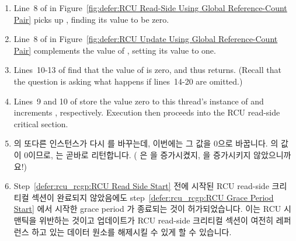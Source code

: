 {\begin{enumerate}
	\item	Line~8 of  in
		Figure~\ref{fig:defer:RCU Read-Side Using Global Reference-Count Pair}
		picks up , finding its value to be zero.
	\item	Line~8 of  in
		Figure~\ref{fig:defer:RCU Update Using Global Reference-Count Pair}
		complements the value of , setting its
		value to one.
	\item	Lines~10-13 of  find that the
		value of  is zero, and thus
		returns.
		(Recall that the question is asking what happens if
		lines~14-20 are omitted.)
	\item	Lines~9 and 10 of  store the
		value zero to this thread's instance of 
		and increments , respectively.
		Execution then proceeds into the RCU read-side critical
		section.
		\label{defer:rcu_rcgp:RCU Read Side Start}
	\fi
	\item	{} 의 또다른 인스턴스가 다시 
		를 바꾸는데, 이번에는 그 값을 0으로 바꿉니다.
		 의 값이 0이므로,  는
		곧바로 리턴합니다.
		( 은  을 증가시켰지,
		 을 증가시키지 않았으니까요!)
		\label{defer:rcu_rcgp:RCU Grace Period Start}
	\item	Step~\ref{defer:rcu_rcgp:RCU Read Side Start} 전에 시작된 RCU
		read-side 크리티컬 섹션이 완료되지 않았음에도
		step~\ref{defer:rcu_rcgp:RCU Grace Period Start} 에서 시작한
		grace period 가 종료되는 것이 허가되었습니다.
		이는 RCU 시맨틱을 위반하는 것이고 업데이트가 RCU read-side
		크리티컬 섹션이 여전히 레퍼런스 하고 있는 데이터 원소를
		해제시킬 수 있게 할 수 있습니다.
	\iffalse

	\item	Another instance of \co{synchronize_rcu()} again complements
		\co{rcu_idx}, this time setting its value to zero.
		Because \co{rcu_refcnt[1]} is zero, \co{synchronize_rcu()}
		returns immediately.
		(Recall that \co{rcu_read_lock()} incremented
		\co{rcu_refcnt[0]}, not \co{rcu_refcnt[1]}!)
		\label{defer:rcu_rcgp:RCU Grace Period Start}
	\item	The grace period that started in
		step~\ref{defer:rcu_rcgp:RCU Grace Period Start}
		has been allowed to end, despite
		the fact that the RCU read-side critical section
		that started beforehand in
		step~\ref{defer:rcu_rcgp:RCU Read Side Start}
		has not completed.
		This violates RCU semantics, and could allow the update
		to free a data element that the RCU read-side critical
		section was still referencing.
	\fi
	\end{enumerate}

}
